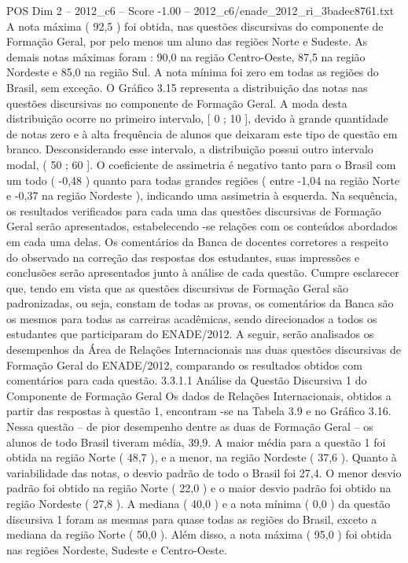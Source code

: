 \begin{textsample}{POS Dim 2 – 2012\_c6 – Score -1.00 – 2012\_c6/enade\_2012\_ri\_3badec8761.txt}
A nota máxima ( 92,5 ) foi obtida, nas questões discursivas do componente de Formação Geral, por pelo menos um aluno das regiões Norte e Sudeste.
As demais notas máximas foram : 90,0 na região Centro-Oeste, 87,5 na região Nordeste e 85,0 na região Sul.
A nota mínima foi zero em todas as regiões do Brasil, sem exceção.
O Gráfico 3.15 representa a distribuição das notas nas questões discursivas no componente de Formação Geral.
A moda desta distribuição ocorre no primeiro intervalo, [ 0 ; 10 ], devido à grande quantidade de notas zero e à alta frequência de alunos que deixaram este tipo de questão em branco.
Desconsiderando esse intervalo, a distribuição possui outro intervalo modal, ( 50 ; 60 ].
O coeficiente de assimetria é negativo tanto para o Brasil com um todo ( -0,48 ) quanto para todas grandes regiões ( entre -1,04 na região Norte e -0,37 na região Nordeste ), indicando uma assimetria à esquerda.
Na sequência, os resultados verificados para cada uma das questões discursivas de Formação Geral serão apresentados, estabelecendo -se relações com os conteúdos abordados em cada uma delas.
Os comentários da Banca de docentes corretores a respeito do observado na correção das respostas dos estudantes, suas impressões e conclusões serão apresentados junto à análise de cada questão.
Cumpre esclarecer que, tendo em vista que as questões discursivas de Formação Geral são padronizadas, ou seja, constam de todas as provas, os comentários da Banca são os mesmos para todas as carreiras acadêmicas, sendo direcionados a todos os estudantes que participaram do ENADE/2012.
A seguir, serão analisados os desempenhos da Área de Relações Internacionais nas duas questões discursivas de Formação Geral do ENADE/2012, comparando os resultados obtidos com comentários para cada questão. 3.3.1.1 Análise da Questão Discursiva 1 do Componente de Formação Geral Os dados de Relações Internacionais, obtidos a partir das respostas à questão 1, encontram -se na Tabela 3.9 e no Gráfico 3.16.
Nessa questão – de pior desempenho dentre as duas de Formação Geral – os alunos de todo Brasil tiveram média, 39,9.
A maior média para a questão 1 foi obtida na região Norte ( 48,7 ), e a menor, na região Nordeste ( 37,6 ).
Quanto à variabilidade das notas, o desvio padrão de todo o Brasil foi 27,4.
O menor desvio padrão foi obtido na região Norte ( 22,0 ) e o maior desvio padrão foi obtido na região Nordeste ( 27,8 ).
A mediana ( 40,0 ) e a nota mínima ( 0,0 ) da questão discursiva 1 foram as mesmas para quase todas as regiões do Brasil, exceto a mediana da região Norte ( 50,0 ).
Além disso, a nota máxima ( 95,0 ) foi obtida nas regiões Nordeste, Sudeste e Centro-Oeste.

\end{textsample}
